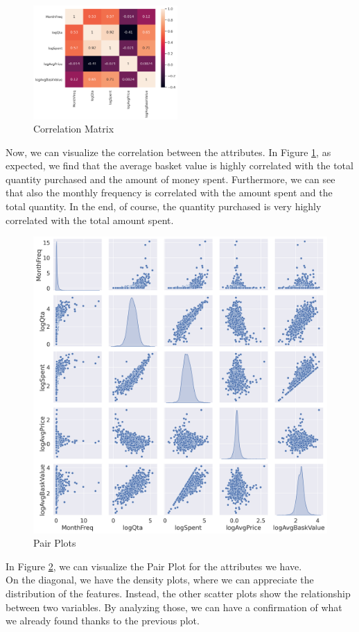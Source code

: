 \begin{figure}
\centering
\includegraphics[width=0.49\textwidth]{img/corr_logs.png}
\caption{Correlation Matrix}
\label{fig:corr_logs}
\end{figure}

Now, we can visualize the correlation between the attributes. In Figure \ref{fig:corr_logs}, as expected, we find that the average basket value is highly correlated with the total quantity purchased and the amount of money spent. Furthermore, we can see that also the monthly frequency is correlated with the amount spent and the total quantity. In the end, of course, the quantity purchased is very highly correlated with the total amount spent.

\vspace{18mm}

\begin{figure}
\centering
\captionsetup{justification=centering}
\includegraphics[width=.49\textwidth]{img/pairplot.png}
\caption{Pair Plots}
\label{fig:pairplot}
\end{figure}

In Figure \ref{fig:pairplot}, we can visualize the Pair Plot for the attributes we have.\\
On the diagonal, we have the density plots, where we can appreciate the distribution of the features. Instead, the other scatter plots show the relationship between two variables. By analyzing those, we can have a confirmation of what we already found thanks to the previous plot. 

